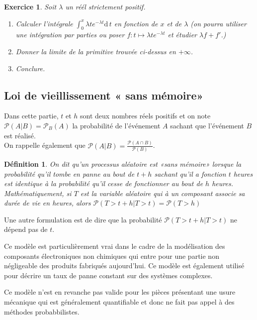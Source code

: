 \documentclass[11pt,a4paper,french]{article}
\newcommand{\diff}[1]{\mathrm{d}\,#1}
\newcommand{\p}{\mathcal{P}}
\theoremstyle{break}
\newtheorem{definition}{Définition}
\theoremstyle{plain}
\newtheorem{exerciceT}{Exercice}
\theoremstyle{nonumberplain}
\theoremstyle{nonumberbreak}
\newenvironment{exercice}{\begin{framed}\begin{exerciceT}}{\end{exerciceT}\end{framed}}
\begin{document}
\begin{exercice}
  Soit $\lambda$ un réél strictement positif.
  \begin{enumerate}
    \item Calculer l'intégrale $\int_0^x \lambda te^{-\lambda t} \diff
      t$ en fonction de $x$ et de $\lambda$ (on pourra utiliser une
        intégration par parties ou poser $f:t\mapsto \lambda
        te^{-\lambda t}$ et étudier $\lambda f + f'$.)
    \item Donner la limite de la primitive trouvée ci-dessus en
      $+\infty$.
    \item Conclure.
  \end{enumerate}
\end{exercice}

\subsection{Loi de vieillissement « sans mémoire»}

Dans cette partie, $t$ et $h$ sont deux nombres réels positifs et on
note $\p(A | B) = \p_B(A)$ la probabilité de l'événement $A$ sachant que
l'événement $B$ est réalisé.\\
On rappelle également que $\p(A | B) = \frac{\p(A\cap B)}{\p(B)}$.

\begin{definition}
  On dit qu'un processus aléatoire est «sans mémoire» lorsque la
  probabilité qu'il tombe en panne au bout de $t+h$ sachant qu'il a
  fonction $t$ heures est identique à la probabilité qu'il cesse de
  fonctionner au bout de $h$ heures. Mathématiquement, si $T$ est la
  variable aléatoire qui à un composant associe sa durée de vie en
  heures, alors $\p(T > t+h | T > t) = \p(T > h)$
\end{definition}

Une autre formulation est de dire que la probabilité $\p(T > t+h | T >
t)$ ne dépend pas de $t$.

Ce modèle est particulièrement vrai dans le cadre de la modélisation des
composants électroniques non chimiques qui entre pour une partie non
négligeable des produits fabriqués aujourd'hui. Ce modèle est également
utilisé pour décrire un taux de panne constant sur des systèmes
complexes.

Ce modèle n'est en revanche pas valide pour les pièces présentant une
usure mécanique qui est généralement quantifiable et donc ne fait pas
appel à des méthodes probabbilistes.
\end{document}
